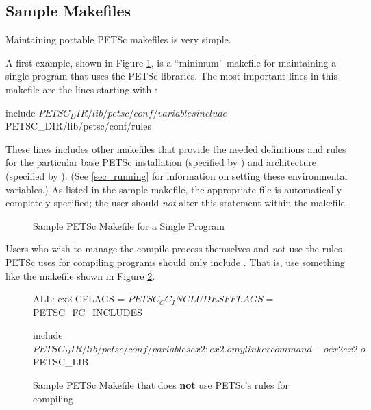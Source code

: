 {{{\subsection{Sample Makefiles}

Maintaining portable PETSc makefiles is very simple.

A first example, shown in Figure \ref{fig_make1}, is a ``minimum'' makefile for maintaining
a single program that uses the PETSc libraries.
The most important lines in this makefile are the lines starting with :
\begin{makelisting}
include ${PETSC_DIR}/lib/petsc/conf/variables
include ${PETSC_DIR}/lib/petsc/conf/rules
\end{makelisting}
These lines includes other makefiles that provide the needed definitions
and rules for the particular base PETSc installation (specified by
) and architecture (specified by
).  (See \ref{sec_running} for information on
setting these environmental variables.)  As listed in the sample
makefile, the appropriate  file is automatically
completely specified; the user should {\em not} alter this statement
within the makefile.

\begin{figure}[H]
\caption{Sample PETSc Makefile for a Single Program}
\label{fig_make1}
\end{figure}

Users who wish to manage the compile process themselves
and {\emph not} use the rules PETSc uses for compiling programs
should only include . That is, use something like
the makefile shown in Figure \ref{fig_make1var}.

\begin{figure}[H]
\begin{makelisting}
   ALL: ex2
   CFLAGS   = ${PETSC_CC_INCLUDES}
   FFLAGS   = ${PETSC_FC_INCLUDES}

   include ${PETSC_DIR}/lib/petsc/conf/variables

   ex2: ex2.o
           mylinkercommand -o ex2 ex2.o  ${PETSC_LIB}
\end{makelisting}
\caption{Sample PETSc Makefile that does {\bf not} use PETSc's rules for compiling}
\label{fig_make1var}
\end{figure}

}}}
